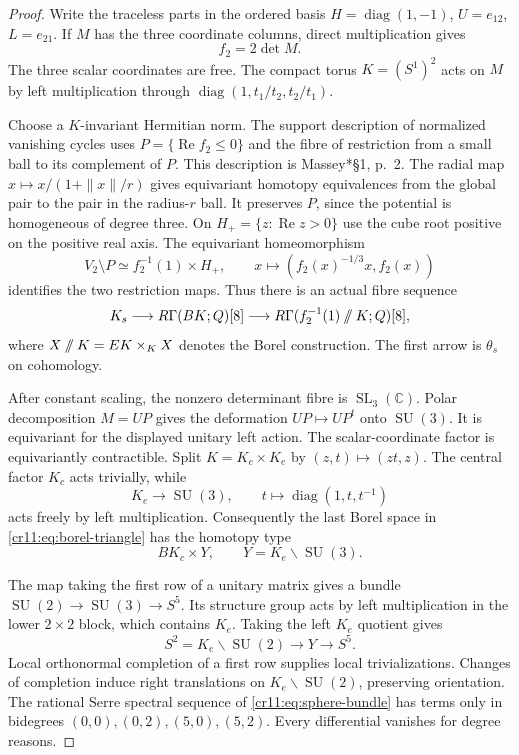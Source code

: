 \begin{proof}
Write the traceless parts in the ordered basis
$H=\operatorname{diag}(1,-1)$, $U=e_{12}$, $L=e_{21}$.
If $M$ has the three coordinate columns, direct multiplication gives
\begin{equation}
 f_2=2\det M.
 \label{cr11:eq:det}
\end{equation}
The three scalar coordinates are free.
The compact torus $K=(S^1)^2$ acts on $M$ by left multiplication
through $\operatorname{diag}(1,t_1/t_2,t_2/t_1)$.

Choose a $K$-invariant Hermitian norm.
The support description of normalized vanishing cycles uses
$P=\{\operatorname{Re}f_2\leq0\}$ and the fibre of restriction from
a small ball to its complement of $P$.
This description is Massey\cite{schMasseyST}*{\S1, p.~2}.
The radial map $x\mapsto x/(1+\|x\|/r)$ gives equivariant homotopy
equivalences from the global pair to the pair in the radius-$r$ ball.
It preserves $P$, since the potential is homogeneous of degree three.
On $H_+=\{z:\operatorname{Re}z>0\}$ use the cube root positive on
the positive real axis. The equivariant homeomorphism
\[
 V_2\setminus P\simeq f_2^{-1}(1)\times H_+,\qquad
 x\longmapsto(f_2(x)^{-1/3}x,f_2(x))
\]
identifies the two restriction maps.
Thus there is an actual fibre sequence
\begin{equation}
 K_s\longrightarrow R\Gamma(BK;\mathbb Q)[8]
   \longrightarrow R\Gamma(f_2^{-1}(1)\mathbin{/\mkern-6mu/}K;\mathbb Q)[8],
 \label{cr11:eq:borel-triangle}
\end{equation}
where $X\mathbin{/\mkern-6mu/}K=EK\times_KX$ denotes the Borel construction.
The first arrow is $\theta_s$ on cohomology.

After constant scaling, the nonzero determinant fibre is
$\operatorname{SL}_3(\mathbb C)$.
Polar decomposition $M=UP$ gives the deformation $UP\mapsto UP^t$
onto $\operatorname{SU}(3)$.
It is equivariant for the displayed unitary left action.
The scalar-coordinate factor is equivariantly contractible.
Split $K=K_c\times K_e$ by
$(z,t)\mapsto(zt,z)$.
The central factor $K_c$ acts trivially, while
\[
 K_e\longrightarrow\operatorname{SU}(3),\qquad
 t\longmapsto\operatorname{diag}(1,t,t^{-1})
\]
acts freely by left multiplication.
Consequently the last Borel space in \eqref{cr11:eq:borel-triangle}
has the homotopy type
\[
 BK_c\times Y,\qquad Y=K_e\backslash\operatorname{SU}(3).
\]

The map taking the first row of a unitary matrix gives a bundle
$\operatorname{SU}(2)\to\operatorname{SU}(3)\to S^5$.
Its structure group acts by left multiplication in the lower
$2\times2$ block, which contains $K_e$.
Taking the left $K_e$ quotient gives
\begin{equation}
 S^2=K_e\backslash\operatorname{SU}(2)\longrightarrow Y\longrightarrow S^5.
 \label{cr11:eq:sphere-bundle}
\end{equation}
Local orthonormal completion of a first row supplies local trivializations.
Changes of completion induce right translations on
$K_e\backslash\operatorname{SU}(2)$, preserving orientation.
The rational Serre spectral sequence of \eqref{cr11:eq:sphere-bundle}
has terms only in bidegrees $(0,0),(0,2),(5,0),(5,2)$.
Every differential vanishes for degree reasons.


\end{proof}
